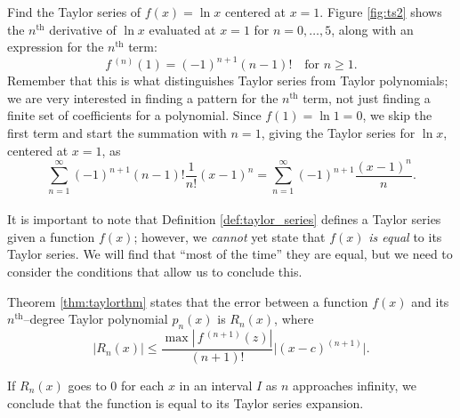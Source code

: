 {Find the Taylor series of $f(x) = \ln x$ centered at $x=1$.}
{Figure \ref{fig:ts2} shows the $n^\text{th}$ derivative of $\ln x$ evaluated at $x=1$ for $n=0,\ldots,5$, along with an expression for the $n^\text{th}$ term: $$f\,^{(n)}(1) = (-1)^{n+1}(n-1)!\quad \text{for $n\geq 1$.}$$ Remember that this is what distinguishes Taylor series from Taylor polynomials; we are very interested in finding a pattern for the $n^\text{th}$ term, not just finding a finite set of coefficients for a polynomial.
Since $f(1) = \ln 1 = 0$, we skip the first term and start the summation with $n=1$, giving the Taylor series for $\ln x$, centered at $x=1$, as 
$$\sum_{n=1}^\infty (-1)^{n+1}(n-1)!\frac{1}{n!}(x-1)^n = \sum_{n=1}^\infty (-1)^{n+1}\frac{(x-1)^n}{n}. $$
\baselineskip
}\\

It is important to note that Definition \ref{def:taylor_series} defines a Taylor series given a function $f(x)$; however, we \emph{cannot} yet state that $f(x)$ \emph{is equal} to its Taylor series. We will find that ``most of the time'' they are equal, but we need to consider the conditions that allow us to conclude this.

Theorem \ref{thm:taylorthm} states that the error between a function $f(x)$ and its $n^\text{th}$--degree Taylor polynomial $p_n(x)$ is $R_n(x)$, where
$$ \big|R_n(x)\big| \leq \frac{\max\left|\,f\,^{(n+1)}(z)\right|}{(n+1)!}\big|(x-c)^{(n+1)}\big|.$$

If $R_n(x)$ goes to 0 for each $x$ in an interval $I$ as $n$ approaches infinity, we conclude that the function is equal to its Taylor series expansion.

